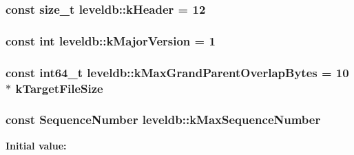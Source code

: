 \hypertarget{namespaceleveldb_a0c307b86a9e098703aa8aa0a55ce504a}{
\subsubsection[{k\-Header}]{\setlength{\rightskip}{0pt plus 5cm}const size\-\_\-t leveldb\-::k\-Header = 12\hspace{0.3cm}{\ttfamily [static]}}}\label{namespaceleveldb_a0c307b86a9e098703aa8aa0a55ce504a}
\hypertarget{namespaceleveldb_ab5f58e0e9055bf647e6b92dc8b69c11f}{
\subsubsection[{k\-Major\-Version}]{\setlength{\rightskip}{0pt plus 5cm}const int leveldb\-::k\-Major\-Version = 1\hspace{0.3cm}{\ttfamily [static]}}}\label{namespaceleveldb_ab5f58e0e9055bf647e6b92dc8b69c11f}
\hypertarget{namespaceleveldb_a68616c3e44088cbae698a3c2b385082f}{
\subsubsection[{k\-Max\-Grand\-Parent\-Overlap\-Bytes}]{\setlength{\rightskip}{0pt plus 5cm}const {\bf int64\-\_\-t} leveldb\-::k\-Max\-Grand\-Parent\-Overlap\-Bytes = 10 $\ast$ {\bf k\-Target\-File\-Size}\hspace{0.3cm}{\ttfamily [static]}}}\label{namespaceleveldb_a68616c3e44088cbae698a3c2b385082f}
\hypertarget{namespaceleveldb_adf59027c8c0dcc54c9d8c3e5ba090463}{
\subsubsection[{k\-Max\-Sequence\-Number}]{\setlength{\rightskip}{0pt plus 5cm}const {\bf Sequence\-Number} leveldb\-::k\-Max\-Sequence\-Number\hspace{0.3cm}{\ttfamily [static]}}}\label{namespaceleveldb_adf59027c8c0dcc54c9d8c3e5ba090463}
{\bfseries Initial value\-:}
